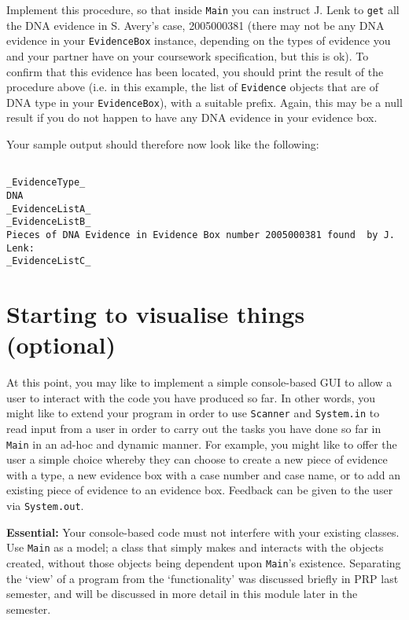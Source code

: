 \documentclass[11pt]{article}
\begin{document}
Implement this procedure, so that inside \texttt{Main} you can instruct J. Lenk to \texttt{get} all the DNA evidence in S. Avery's case, 2005000381 (there may not be any DNA evidence in your \texttt{EvidenceBox} instance, depending on the types of evidence you and your partner have on your coursework specification, but this is ok). To confirm that this evidence has been located, you should print the result of the procedure above (i.e. in this example, the list of \texttt{Evidence} objects that are of DNA type in your \texttt{EvidenceBox}), with a suitable prefix. Again, this may be a null result if you do not happen to have any DNA evidence in your evidence box.

Your sample output should therefore now look like the following:

\vspace{-8mm}

\begin{verbatim}

_EvidenceType_
DNA
_EvidenceListA_
_EvidenceListB_
Pieces of DNA Evidence in Evidence Box number 2005000381 found  by J. Lenk: 
_EvidenceListC_

\end{verbatim}

\vspace{-8mm}

\section{Starting to visualise things (optional)}

At this point, you may like to implement a simple console-based GUI to allow a user to interact with the code you have produced so far. In other words, you might like to extend your program in order to use \texttt{Scanner} and \texttt{System.in} to read input from a user in order to carry out the tasks you have done so far in \texttt{Main} in an ad-hoc and dynamic manner. For example, you might like to offer the user a simple choice whereby they can choose to create a new piece of evidence with a type, a new evidence box with a case number and case name, or to add an existing piece of evidence to an evidence box. Feedback can be given to the user via \texttt{System.out}.

\textbf{Essential:} Your console-based code must not interfere with your existing classes. Use \texttt{Main} as a model; a class that simply makes and interacts with the objects created, without those objects being dependent upon \texttt{Main}'s existence. Separating the `view' of a program from the `functionality' was discussed briefly in PRP last semester, and will be discussed in more detail in this module later in the semester.
\end{document}
